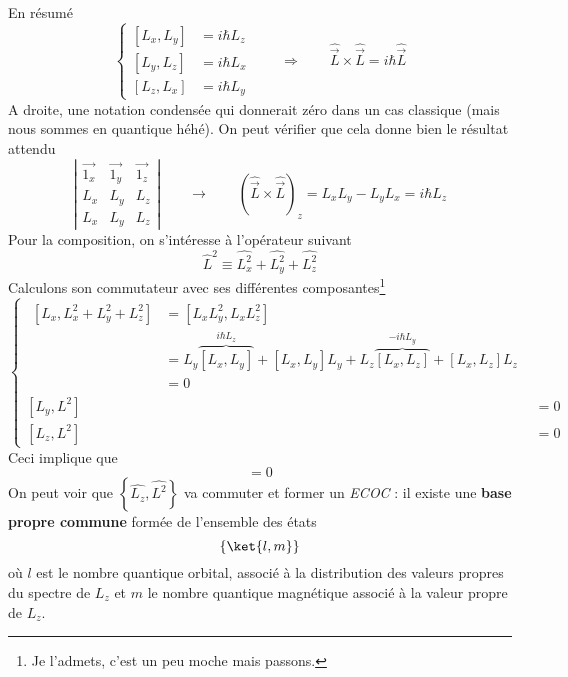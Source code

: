 	En résumé
	\begin{equation}
	\left\{\begin{array}{ll}
	\left[L_x,L_y\right] &= i\hbar L_z\\
	\left[L_y,L_z\right] &= i\hbar L_x\\
	\left[L_z,L_x\right] &= i\hbar L_y		
	\end{array}\right.\qquad\Longrightarrow\qquad \hat{\vec{L}}\times\hat{\vec{L}} = i\hbar
	\hat{\vec{L}}
	\end{equation}
	A droite, une notation condensée qui donnerait zéro dans un cas classique (mais nous sommes 
	en quantique héhé). On peut vérifier que cela donne bien le résultat attendu
	\begin{equation}
	\left|\begin{array}{ccc}
	\vec{1_x} & \vec{1_y} & \vec{1_z}\\
	L_x & L_y & L_z\\
	L_x & L_y & L_z	
	\end{array}\right|\qquad \longrightarrow \qquad(\hat{\vec{L}}\times\hat{\vec{L}})_z = L_xL_y-L_yL_x
	 = i\hbar L_z
	\end{equation}
	Pour la composition, on s'intéresse à l'opérateur suivant
	\begin{equation}
	\hat{L}^2 \equiv \hat{L_x^2}+\hat{L_y^2}+\hat{L_z^2}
	\end{equation}
	Calculons son commutateur avec ses différentes composantes\footnote{Je l'admets, c'est un peu 
	moche mais passons.}
	\begin{equation}
	\left\{\begin{array}{ll}
	\begin{array}{ll}
	\left[L_x,L_x^2+L_y^2+L_z^2\right] &= \left[L_xL_y^2, L_xL_z^2\right]\\
	&= L_y\overbrace{\left[L_x,L_y\right]}^{i\hbar L_z}+\left[L_x,L_y\right]L_y + L_z\overbrace{\left[L_x,L_z\right]}^{-i\hbar L_y}
	+\left[L_x,L_z\right]L_z\\
	&= 0
	\end{array}\\
	\left[L_y,L^2\right] &= 0\\
	\left[L_z,L^2\right] &= 0
	\end{array}\right.
	\end{equation}
	Ceci implique que
	\begin{equation}
	[\hat{\vec{L}},L^2] = 0
	\end{equation}
	On peut voir que $\left\{\hat{L_z},\hat{L^2}\right\}$ va commuter et former un \textit{ECOC} 
	: il existe une \textbf{base propre commune} formée de l'ensemble des états
	\begin{equation}
	\left\{\ket{l,m}\right\}
	\end{equation}
	où $l$ est le nombre quantique orbital, associé à la distribution des valeurs propres du 
	spectre de $L_z$ et $m$ le nombre quantique magnétique associé à la valeur propre de $L_z$. 


